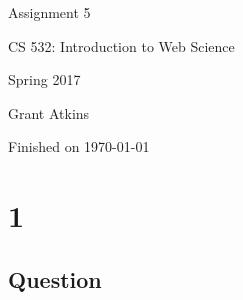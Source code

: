 \documentclass[letterpaper,11pt]{article}
\begin{document}
\begin{titlepage}

\begin{center}

\Huge{Assignment 5}

\Large{CS 532:  Introduction to Web Science}

\Large{Spring 2017}

\Large{Grant Atkins}

\Large Finished on \today

\end{center}

\end{titlepage}

\newpage


\section*{1}

\subsection*{Question}
\end{document}
